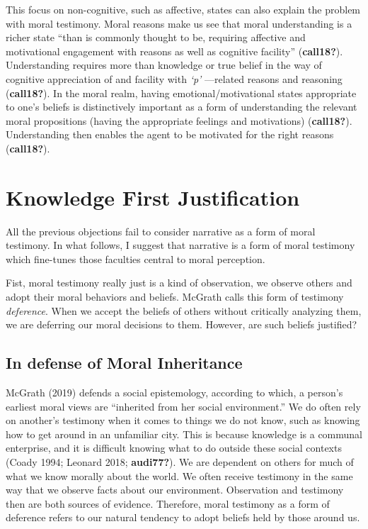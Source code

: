 \documentclass[12pt]{book}
\theoremstyle{definition}
\theoremstyle{remark}
\begin{document}
This focus on non-cognitive, such as affective, states can also explain the problem with moral testimony. Moral reasons make us see that moral understanding is a richer state ``than is commonly thought to be, requiring affective and motivational engagement with reasons as well as cognitive facility'' (\textbf{call18?}). Understanding requires more than knowledge or true belief in the way of cognitive appreciation of and facility with \emph{`p'} ---related reasons and reasoning (\textbf{call18?}). In the moral realm, having emotional/motivational states appropriate to one's beliefs is distinctively important as a form of understanding the relevant moral propositions (having the appropriate feelings and motivations) (\textbf{call18?}). Understanding then enables the agent to be motivated for the right reasons (\textbf{call18?}).

\section{Knowledge First Justification}\label{knowledge-first-justification}

All the previous objections fail to consider narrative as a form of moral testimony. In what follows, I suggest that narrative is a form of moral testimony which fine-tunes those faculties central to moral perception.

Fist, moral testimony really just is a kind of observation, we observe others and adopt their moral behaviors and beliefs. McGrath calls this form of testimony \emph{deference}. When we accept the beliefs of others without critically analyzing them, we are deferring our moral decisions to them. However, are such beliefs justified?

\subsection*{In defense of Moral Inheritance}\label{in-defense-of-moral-inheritance-1}

McGrath (2019) defends a social epistemology, according to which, a person's earliest moral views are ``inherited from her social environment.'' We do often rely on another's testimony when it comes to things we do not know, such as knowing how to get around in an unfamiliar city. This is because knowledge is a communal enterprise, and it is difficult knowing what to do outside these social contexts (Coady 1994; Leonard 2018; \textbf{audi77?}). We are dependent on others for much of what we know morally about the world. We often receive testimony in the same way that we observe facts about our environment. Observation and testimony then are both sources of evidence. Therefore, moral testimony as a form of deference refers to our natural tendency to adopt beliefs held by those around us.
\end{document}
